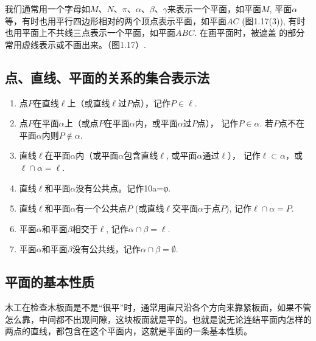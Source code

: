 我们通常用一个字母如$M$、$N$、$\pi$、$\alpha$、$\beta$、$\gamma$来表示一个平面，如平面$M$, 平面$\alpha$等，有时也用平行四边形相对的两个顶点表示平面，如平面$AC$ (图1.17(3)), 有时也用平面上不共线三点表示一个平面，如平面$ABC$. 在画平面时，被遮盖
的部分常用虚线表示或不画出来。（图1.17）.

\begin{figure}[htp]
  \centering
  
  \caption{}
\end{figure}


\subsection{点、直线、平面的关系的集合表示法}

\begin{enumerate}
  \item 点$P$在直线$\ell$上（或直线$\ell$过$P$点），记作$P\in\ell$.
  \item 点$P$在平面$\alpha$上（或点$P$在平面$\alpha$内，或平面$\alpha$过$P$点），
记作$P\in\alpha$. 若$P$点不在平面$\alpha$内则$P\notin \alpha$.
\item 直线$\ell$在平面$\alpha$内（或平面$\alpha$包含直线$\ell$, 或平面$\alpha$通过$\ell$），
记作$\ell\subset \alpha$，或$\ell\cap \alpha=\ell$.
\item 直线$\ell$和平面$\alpha$没有公共点。记作10a=φ.
\item 直线$\ell$和平面$\alpha$有一个公共点$P$ (或直线$\ell$交平面$\alpha$于点$P$), 
记作$\ell\cap \alpha=P$.
\item 平面$\alpha$和平面$\beta$相交于$\ell$, 记作$\alpha\cap \beta=\ell$.
\item 平面$\alpha$和平面$\beta$没有公共线，记作$\alpha\cap \beta=\emptyset$.
\end{enumerate}

\begin{figure}[htp]
  \centering
  
  \caption{}
\end{figure}




\subsection{平面的基本性质}

木工在检查木板面是不是“很平”时，通常用直尺沿各个方向来靠紧板面，如果不管怎么靠，中间都不出现间隙，这块板面就是平的。也就是说无论连结平面内怎样的两点的直线，都包含在这个平面内，这就是平面的一条基本性质。

